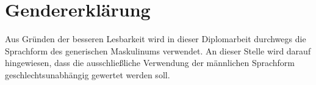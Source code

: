 \section*{Gendererklärung}

Aus Gründen der besseren Lesbarkeit wird in dieser Diplomarbeit durchwegs die Sprachform des
generischen Maskulinums verwendet. An dieser Stelle wird darauf hingewiesen, dass die
ausschließliche Verwendung der männlichen Sprachform geschlechtsunabhängig gewertet werden soll.

\newpage